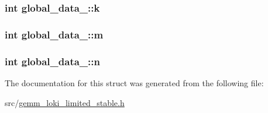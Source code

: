\subsubsection[{k}]{\setlength{\rightskip}{0pt plus 5cm}int global\+\_\+data\+\_\+\+::k}\hypertarget{structglobal__data___ac9f5f51840a60f3c3635644adfec2a45}{}\label{structglobal__data___ac9f5f51840a60f3c3635644adfec2a45}
\subsubsection[{m}]{\setlength{\rightskip}{0pt plus 5cm}int global\+\_\+data\+\_\+\+::m}\hypertarget{structglobal__data___a6740cdc873f2d9912fba9fbef577ac60}{}\label{structglobal__data___a6740cdc873f2d9912fba9fbef577ac60}
\subsubsection[{n}]{\setlength{\rightskip}{0pt plus 5cm}int global\+\_\+data\+\_\+\+::n}\hypertarget{structglobal__data___af3bcbc68bcda1683ba4f01d925bfe7e2}{}\label{structglobal__data___af3bcbc68bcda1683ba4f01d925bfe7e2}


The documentation for this struct was generated from the following file\+:\begin{DoxyCompactItemize}
\item 
src/\hyperlink{gemm__loki__limited__stable_8h}{gemm\+\_\+loki\+\_\+limited\+\_\+stable.\+h}\end{DoxyCompactItemize}
